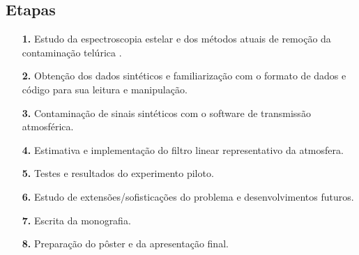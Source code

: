 \documentclass[11pt,twoside,a4paper]{article}
\begin{document}
\subsection{Etapas}
\begin{itemize}
    \item [\textbf{1.}] Estudo da espectroscopia estelar e dos métodos atuais de remoção da contaminação telúrica .
    \item [\textbf{2.}] Obtenção dos dados sintéticos e familiarização com o formato de dados e código para sua leitura e manipulação.
    \item [\textbf{3.}] Contaminação de sinais sintéticos com o software de transmissão atmosférica.
    \item [\textbf{4.}] Estimativa e implementação do filtro linear representativo da atmosfera.
    \item [\textbf{5.}] Testes e resultados do experimento piloto.
    \item [\textbf{6.}] Estudo de extensões/sofisticações do problema e desenvolvimentos futuros.
    \item [\textbf{7.}] Escrita da monografia.
    \item [\textbf{8.}] Preparação do pôster e da apresentação final.
\end{itemize}
\end{document}
